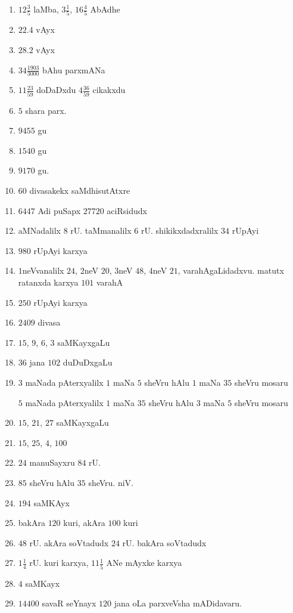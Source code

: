 \begin{multicols}{2}
\begin{enumerate}[$(1)$]
\item $12\frac{3}{5}$ laMba, $3\frac{1}{5}$, $16\frac{4}{5}$ AbAdhe
\item $22.4$ vAyx 
\item $28.2$ vAyx
\item $34 \frac{1903}{3000}$ bAhu parxmANa
\item $11\frac{23}{59}$ doDaDxdu $4\frac{36}{59}$ cikakxdu
\item $5$ shara parx.
\item $9455$ gu
\item $1540$ gu
\item $9170$ gu.
\item $60$ divasakekx saMdhisutAtxre
\item $6447$ Adi puSapx $27720$ aciRsidudx
\item aMNadalilx $8$ rU. taMmanalilx $6$ rU. shikikxdadxralilx $34$
rUpAyi
\item $980$ rUpAyi karxya
\item $1$neVvanalilx $24$, $2$neV $20$, $3$neV $48$, $4$neV $21$,
varahAgaLidadxvu. matutx ratanxda karxya $101$ varahA
\item $250$ rUpAyi karxya
\item $2409$ divasa
\item $15$, $9$, $6$, $3$ saMKayxgaLu
\item $36$ jana $102$ duDuDxgaLu
\item $3$ maNada pAterxyalilx 
      $1$ maNa $5$ sheVru hAlu
      $1$ maNa $35$ sheVru mosaru

      $5$ maNada pAterxyalilx 
      $1$ maNa $35$ sheVru hAlu
      $3$ maNa $5$ sheVru mosaru
\item $15$, $21$, $27$ saMKayxgaLu
\item $15$, $25$, $4$, $100$
\item $24$ manuSayxru $84$ rU.
\item $85$ sheVru hAlu $35$ sheVru. niV.
\item $194$ saMKAyx
\item bakAra $120$ kuri, akAra $100$ kuri
\item $48$ rU. akAra soVtadudx $24$ rU. bakAra soVtadudx
\item $1\frac{1}{4}$ rU. kuri karxya, $11\frac{1}{5}$ ANe mAyxke
      karxya
\item $4$ saMKayx
\item $14400$ savaR seYnayx $120$ jana oLa parxveVsha mADidavaru.
\end{enumerate}
\end{multicols}

